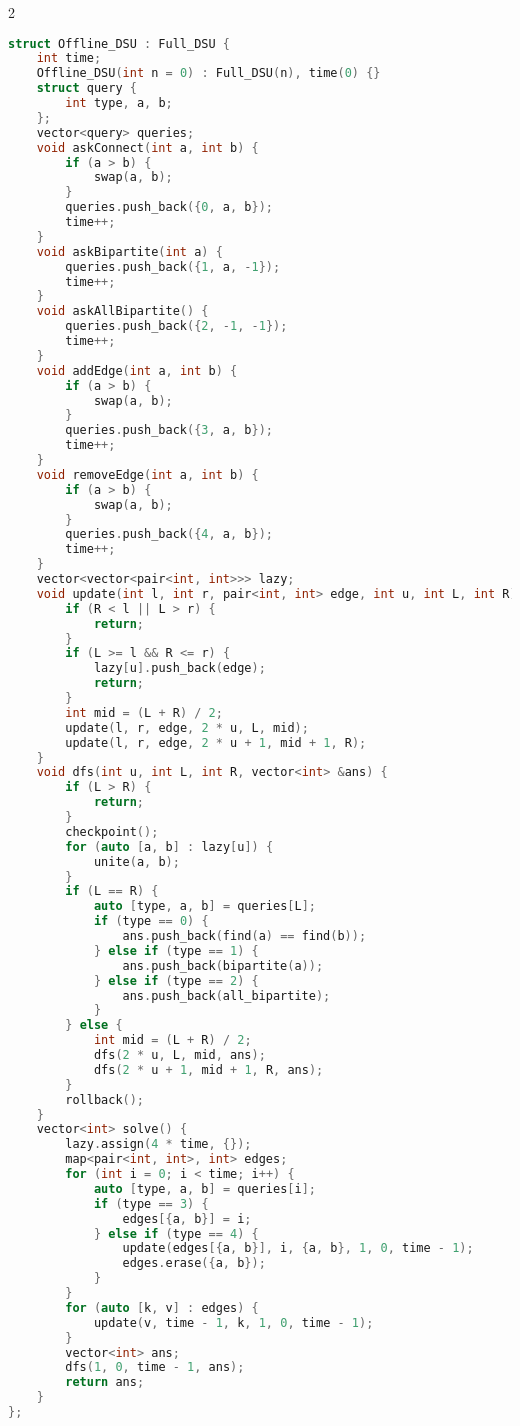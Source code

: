 \documentclass[11pt, a4paper, oneside]{book}
\begin{document}
\begin{multicols}{2}
\begin{lstlisting}[language=C++]
struct Offline_DSU : Full_DSU {
    int time;
    Offline_DSU(int n = 0) : Full_DSU(n), time(0) {}
    struct query {
        int type, a, b;
    };
    vector<query> queries;
    void askConnect(int a, int b) {
        if (a > b) {
            swap(a, b);
        }
        queries.push_back({0, a, b});
        time++;
    }
    void askBipartite(int a) {
        queries.push_back({1, a, -1});
        time++;
    }
    void askAllBipartite() {
        queries.push_back({2, -1, -1});
        time++;
    }
    void addEdge(int a, int b) {
        if (a > b) {
            swap(a, b);
        }
        queries.push_back({3, a, b});
        time++;
    }
    void removeEdge(int a, int b) {
        if (a > b) {
            swap(a, b);
        }
        queries.push_back({4, a, b});
        time++;
    }
    vector<vector<pair<int, int>>> lazy;
    void update(int l, int r, pair<int, int> edge, int u, int L, int R) {
        if (R < l || L > r) {
            return;
        }
        if (L >= l && R <= r) {
            lazy[u].push_back(edge);
            return;
        }
        int mid = (L + R) / 2;
        update(l, r, edge, 2 * u, L, mid);
        update(l, r, edge, 2 * u + 1, mid + 1, R);
    }
    void dfs(int u, int L, int R, vector<int> &ans) {
        if (L > R) {
            return;
        }
        checkpoint();
        for (auto [a, b] : lazy[u]) {
            unite(a, b);
        }
        if (L == R) {
            auto [type, a, b] = queries[L];
            if (type == 0) {
                ans.push_back(find(a) == find(b));
            } else if (type == 1) {
                ans.push_back(bipartite(a));
            } else if (type == 2) {
                ans.push_back(all_bipartite);
            }
        } else {
            int mid = (L + R) / 2;
            dfs(2 * u, L, mid, ans);
            dfs(2 * u + 1, mid + 1, R, ans);
        }
        rollback();
    }
    vector<int> solve() {
        lazy.assign(4 * time, {});
        map<pair<int, int>, int> edges;
        for (int i = 0; i < time; i++) {
            auto [type, a, b] = queries[i];
            if (type == 3) {
                edges[{a, b}] = i;
            } else if (type == 4) {
                update(edges[{a, b}], i, {a, b}, 1, 0, time - 1);
                edges.erase({a, b});
            }
        }
        for (auto [k, v] : edges) {
            update(v, time - 1, k, 1, 0, time - 1);
        }
        vector<int> ans;
        dfs(1, 0, time - 1, ans);
        return ans;
    }
};\end{lstlisting}
\end{multicols}
\end{document}
